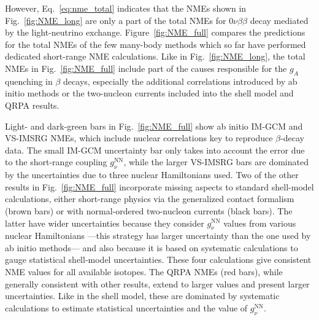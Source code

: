 However, Eq.~\eqref{eq:nme_total} indicates that the NMEs shown in Fig.~\ref{fig:NME_long} are only a part of the total NMEs for $0\nu\beta\beta$ decay mediated by the light-neutrino exchange. Figure~\ref{fig:NME_full} compares the predictions for the total NMEs of the few many-body methods which so far have performed dedicated short-range NME calculations. Like in Fig.~\ref{fig:NME_long}, the total NMEs in Fig.~\ref{fig:NME_full} include part of the causes responsible for the $g_A$ quenching in $\beta$ decays, especially the additional correlations introduced by ab initio methods or the two-nucleon currents included into the shell model and QRPA results.

Light- and dark-green bars in Fig.~\ref{fig:NME_full} show ab initio IM-GCM and VS-IMSRG NMEs, which include nuclear correlations key to reproduce $\beta$-decay data. The small IM-GCM uncertainty bar only takes into account the error due to the short-range coupling $g^{\text{NN}}_\nu$, while the larger VS-IMSRG bars are dominated by the uncertainties due to three nuclear Hamiltonians used. Two of the other results in Fig.~\ref{fig:NME_full} incorporate missing aspects to standard shell-model calculations, either short-range physics via the generalized contact formalism (brown bars) or with normal-ordered two-nucleon currents (black bars). The latter have wider uncertainties because they consider $g^{\text{NN}}_\nu$ values from various nuclear Hamiltonians ---this strategy has larger uncertainty than the one used by ab initio methods--- and also because it is based on systematic calculations to gauge statistical shell-model uncertainties. These four calculations give consistent NME values for all available isotopes. The QRPA NMEs (red bars), while generally consistent with other results, extend to larger values and present larger uncertainties. Like in the shell model, these are dominated by systematic calculations to estimate statistical uncertainties and the value of $g^{\text{NN}}_\nu$.

